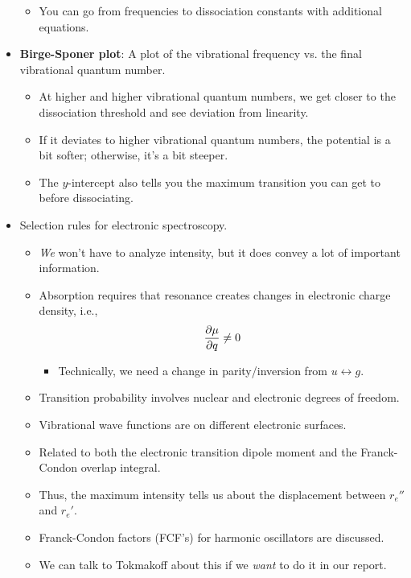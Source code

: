 \documentclass[../notes.tex]{subfiles}
\begin{document}
\begin{itemize}
\begin{itemize}
        \item You can go from frequencies to dissociation constants with additional equations.
    \end{itemize}
    \item \textbf{Birge-Sponer plot}: A plot of the vibrational frequency vs. the final vibrational quantum number.
    \begin{itemize}
        \item At higher and higher vibrational quantum numbers, we get closer to the dissociation threshold and see deviation from linearity.
        \item If it deviates to higher vibrational quantum numbers, the potential is a bit softer; otherwise, it's a bit steeper.
        \item The $y$-intercept also tells you the maximum transition you can get to before dissociating.
    \end{itemize}
    \item Selection rules for electronic spectroscopy.
    \begin{itemize}
        \item \emph{We} won't have to analyze intensity, but it does convey a lot of important information.
        \item Absorption requires that resonance creates changes in electronic charge density, i.e.,
        \begin{equation*}
            \pdv{\mu}{q} \neq 0
        \end{equation*}
        \begin{itemize}
            \item Technically, we need a change in parity/inversion from $u\leftrightarrow g$.
        \end{itemize}
        \item Transition probability involves nuclear and electronic degrees of freedom.
        \item Vibrational wave functions are on different electronic surfaces.
        \item Related to both the electronic transition dipole moment and the Franck-Condon overlap integral.
        \item Thus, the maximum intensity tells us about the displacement between $r_e''$ and $r_e'$.
        \item Franck-Condon factors (FCF's) for harmonic oscillators are discussed.
        \item We can talk to Tokmakoff about this if we \emph{want} to do it in our report.

\end{itemize}
\end{itemize}
\end{document}
